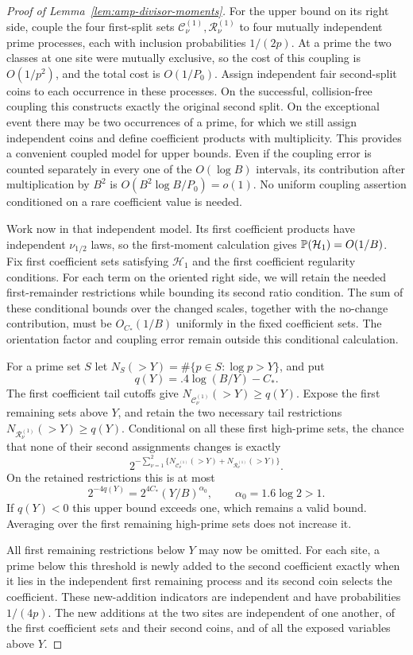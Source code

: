 \begin{proof}[Proof of Lemma~\ref{lem:amp-divisor-moments}]
For the upper bound on its right side, couple the four first-split
sets $\mathcal C_\nu^{(1)},\mathcal R_\nu^{(1)}$ to four mutually
independent prime processes, each with inclusion probabilities
$1/(2p)$.  At a prime the two classes at one site were mutually
exclusive, so the cost of this coupling is $O(1/p^2)$, and the
total cost is $O(1/P_0)$.  Assign independent fair second-split
coins to each occurrence in these processes.  On the successful,
collision-free coupling this constructs exactly the original
second split.  On the exceptional event there may be two
occurrences of a prime, for which we still assign independent
coins and define coefficient products with multiplicity.  This
provides a convenient coupled model for upper bounds.  Even if
the coupling error is counted separately in every one of the
$O(\log B)$ intervals, its contribution after multiplication by
$B^2$ is $O(B^2\log B/P_0)=o(1)$.  No uniform coupling assertion
conditioned on a rare coefficient value is needed.

Work now in that independent model. Its first coefficient products have
independent $\nu_{1/2}$ laws, so the first-moment calculation gives
$\mathbb P(\mathcal H_1)=O(1/B)$. Fix first coefficient sets satisfying
$\mathcal H_1$ and the first coefficient regularity conditions.
For each term on the oriented right side,
we will retain the needed first-remainder restrictions while bounding
its second ratio condition. The sum of these conditional bounds over
the changed scales, together with the no-change contribution, must be
$O_{C_*}(1/B)$ uniformly in the fixed coefficient sets. The orientation
factor and coupling error remain outside this conditional calculation.

For a prime set $S$ let
$N_S(>Y)=\#\{p\in S:\log p>Y\}$, and put
\[
 q(Y)=.4\log(B/Y)-C_*.
\]
The first coefficient tail cutoffs give
$N_{\mathcal C_\nu^{(1)}}(>Y)\ge q(Y)$.
Expose the first remaining sets above $Y$, and retain the two
necessary tail restrictions
$N_{\mathcal R_\nu^{(1)}}(>Y)\ge q(Y)$.
Conditional on all these first high-prime sets, the chance that
none of their second assignments changes is exactly
\[
 2^{-\sum_{\nu=1}^2
       \{N_{\mathcal C_\nu^{(1)}}(>Y)
        +N_{\mathcal R_\nu^{(1)}}(>Y)\}}.
\]
On the retained restrictions this is at most
\[
 2^{-4q(Y)}
 =2^{4C_*}(Y/B)^{\alpha_0},
 \qquad \alpha_0=1.6\log2>1.
\]
If $q(Y)<0$ this upper bound exceeds one, which remains a valid
bound.  Averaging over the first remaining high-prime sets does
not increase it.

All first remaining restrictions below $Y$ may now be omitted.
For each site, a prime below this threshold is newly added to
the second coefficient exactly when it lies in the independent
first remaining process and its second coin selects the
coefficient.  These new-addition indicators are independent and
have probabilities $1/(4p)$.  The new additions at the two sites
are independent of one another, of the first coefficient sets
and their second coins, and of all the exposed variables above
$Y$.


\end{proof}

